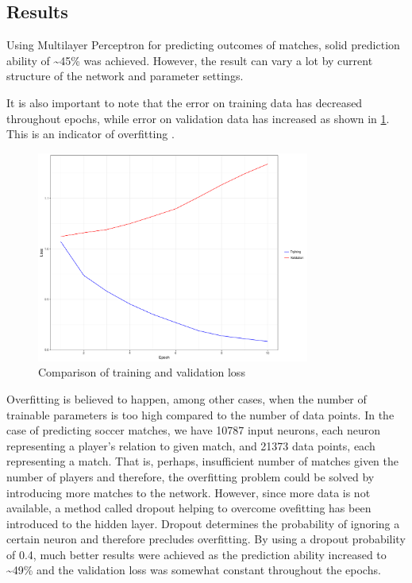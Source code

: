 \subsection{Results}
Using Multilayer Perceptron for predicting outcomes of matches, solid prediction ability of \textasciitilde 45\% was achieved. However, the result can vary a lot by current structure of the network and parameter settings. 

It is also important to note that the error on training data has decreased throughout epochs, while error on validation data has increased as shown in \ref{fig:overfitting}. This is an indicator of overfitting \citep{CaruanaOverfittingNeuralNets2000}.

\begin{figure}[H]
\caption{Comparison of training and validation loss}
\label{fig:overfitting}
\centering
\includegraphics[width=0.8\textwidth]{figs/overfitting}
\end{figure}

Overfitting is believed to happen, among other cases, when the number of trainable parameters is too high compared to the number of data points. In the case of predicting soccer matches, we have 10787 input neurons, each neuron representing a player's relation to given match, and 21373 data points, each representing a match. That is, perhaps, insufficient number of matches given the number of players and therefore, the overfitting problem could be solved by introducing more matches to the network. However, since more data is not available, a method called dropout \citep{SrivastavaDropoutSimpleWay2014} helping to overcome ovefitting has been introduced to the hidden layer. Dropout determines the probability of ignoring a certain neuron and therefore precludes overfitting. By using a dropout probability of 0.4, much better results were achieved as the prediction ability increased to \textasciitilde 49\% and the validation loss was somewhat constant throughout the epochs.

